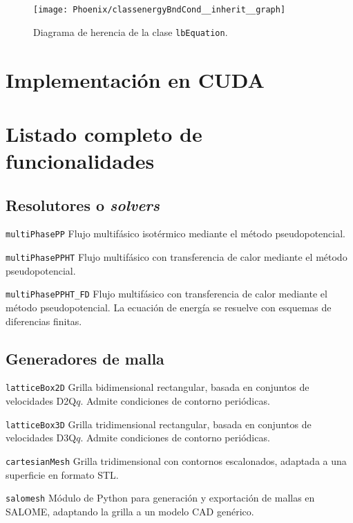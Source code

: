 \begin{figure}[ht]
	\centering
	\texttt{[image: Phoenix/classenergyBndCond\_\_inherit\_\_graph]}
	\caption{Diagrama de herencia de la clase \texttt{lbEquation}.}
	\label{fig:energy_bnd}
\end{figure}



\section{Implementaci\'on en CUDA}


\section{Listado completo de funcionalidades}

\subsection{Resolutores o \emph{solvers}}

\texttt{multiPhasePP}\: Flujo multif\'asico isot\'ermico mediante el m\'etodo pseudopotencial.
\medskip

\texttt{multiPhasePPHT}\: Flujo multif\'asico con transferencia de calor mediante el m\'etodo pseudopotencial.
\medskip

\texttt{multiPhasePPHT\_FD}\: Flujo multif\'asico con transferencia de calor mediante el m\'etodo pseudopotencial. La ecuaci\'on de energ\'ia se resuelve con esquemas de diferencias finitas.
\medskip


\subsection{Generadores de malla}

\texttt{latticeBox2D}\: Grilla bidimensional rectangular, basada en conjuntos de velocidades D2Q$q$. Admite condiciones de contorno peri\'odicas.
\medskip

\texttt{latticeBox3D}\: Grilla tridimensional rectangular, basada en conjuntos de velocidades D3Q$q$. Admite condiciones de contorno peri\'odicas.
\medskip

\texttt{cartesianMesh}\: Grilla tridimensional con contornos escalonados, adaptada a una superficie en formato STL. 
\medskip

\texttt{salomesh}\: M\'odulo de Python para generaci\'on y exportaci\'on de mallas en SALOME, adaptando la grilla a un modelo CAD gen\'erico.
\medskip


